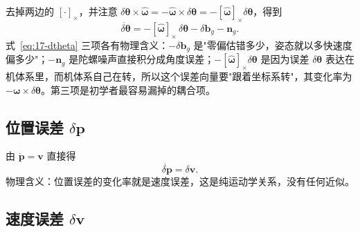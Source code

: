去掉两边的 $[\cdot]_\times$，并注意 $\delta\bm{\theta}\times\hat{\bm{\omega}}=-\hat{\bm{\omega}}\times\delta\bm{\theta}=-[\hat{\bm{\omega}}]_\times\delta\bm{\theta}$，得到
\begin{equation}\label{eq:17-dtheta}
  \dot{\delta\bm{\theta}}=-[\hat{\bm{\omega}}]_\times\,\delta\bm{\theta}-\delta\bm{b}_g-\bm{n}_g.
\end{equation}
式~\eqref{eq:17-dtheta} 三项各有物理含义：$-\delta\bm{b}_g$ 是"零偏估错多少，姿态就以多快速度偏多少"；$-\bm{n}_g$ 是陀螺噪声直接积分成角度误差；$-[\hat{\bm{\omega}}]_\times\delta\bm{\theta}$ 是因为误差 $\delta\bm{\theta}$ 表达在机体系里，而机体系自己在转，所以这个误差向量要"跟着坐标系转"，其变化率为 $-\bm{\omega}\times\delta\bm{\theta}$。第三项是初学者最容易漏掉的耦合项。

\subsection{位置误差 $\delta\bm{p}$}

由 $\dot{\bm{p}}=\bm{v}$ 直接得
\begin{equation}\label{eq:17-dp}
  \dot{\delta\bm{p}}=\delta\bm{v}.
\end{equation}
物理含义：位置误差的变化率就是速度误差，这是纯运动学关系，没有任何近似。

\subsection{速度误差 $\delta\bm{v}$}

